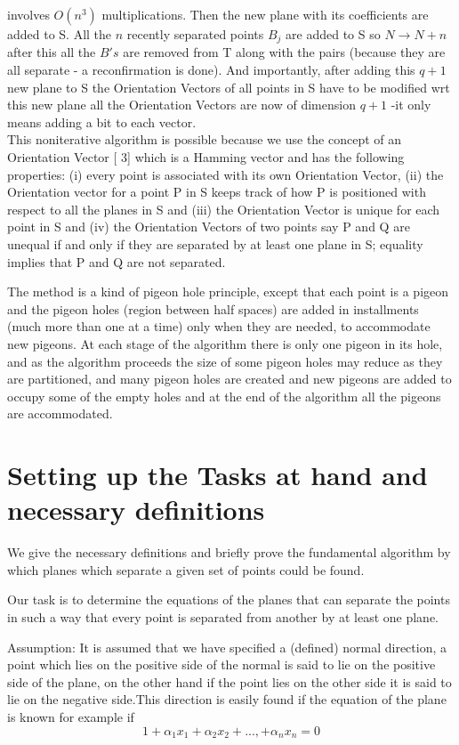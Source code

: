 \documentclass[english]{article}
\begin{document}
involves $O(n^{3})$ multiplications. Then the new plane with its
coefficients are added to S. All the $n$ recently separated points
$B_{j}$ are added to S so $N\rightarrow N+n$ after this all the
$B's$ are removed from T along with the pairs (because they are all
separate - a reconfirmation is done). And importantly, after adding
this $q+1$ new plane to S the Orientation Vectors of all points in
S have to be modified wrt this new plane all the Orientation Vectors
are now of dimension $q+1$ -it only means adding a bit to each vector.
\\
This noniterative algorithm is possible because we use the concept
of an Orientation Vector {[} 3{]} which is a Hamming vector and has
the following properties: (i) every point is associated with its own
Orientation Vector, (ii) the Orientation vector for a point P in S
keeps track of how P is positioned with respect to all the planes
in S and (iii) the Orientation Vector is unique for each point in
S and (iv) the Orientation Vectors of two points say P and Q are unequal
if and only if they are separated by at least one plane in S; equality
implies that P and Q are not separated.

The method is a kind of pigeon hole principle, except that each point
is a pigeon and the pigeon holes (region between half spaces) are
added in installments (much more than one at a time) only when they
are needed, to accommodate new pigeons. At each stage of the algorithm
there is only one pigeon in its hole, and as the algorithm proceeds
the size of some pigeon holes may reduce as they are partitioned, and  many pigeon holes are created and new pigeons are added to occupy some of the empty holes and at the end of the algorithm all the pigeons are accommodated.

\section{Setting up the Tasks at hand and necessary definitions}

We give the necessary definitions and briefly prove the fundamental
algorithm by which planes which separate a given set of points could
be found. 

Our task is to determine the equations of the planes that can separate
the points in such a way that every point is separated from another
by at least one plane.

Assumption: It is assumed that we have specified a (defined) normal
direction, a point which lies on the positive side of the normal is
said to lie on the positive side of the plane, on the other hand if
the point lies on the other side it is said to lie on the negative
side.This direction is easily found if the equation of the plane is
known for example if 
\begin{equation}
1+\alpha_{1}x_{1}+\alpha_{2}x_{2}+...,+\alpha_{n}x_{n}=0
\end{equation}
\end{document}
